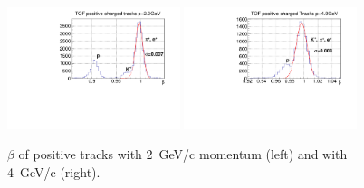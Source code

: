 \begin{figure}[tbp]
\begin{center}
\includegraphics[width=0.45\textwidth]{figures/TOF_postracks_2000mev.pdf}
\includegraphics[width=0.45\textwidth]{figures/TOF_postracks_4000mev.pdf}
\caption{\label{fig:betaproj}$\beta$ of positive tracks with 2~GeV/c momentum (left) and with 4~GeV/c (right).}
\end{center}
\end{figure}
